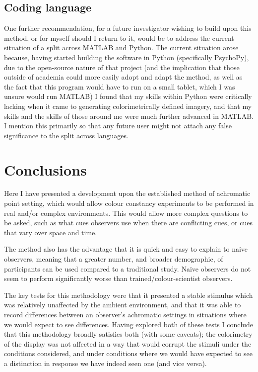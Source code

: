 \subsection{Coding language}

One further recommendation, for a future investigator wishing to build upon this method, or for myself should I return to it, would be to address the current situation of a split across \gls{MATLAB} and Python. The current situation arose because, having started building the software in Python (specifically PsychoPy), due to the open-source nature of that project (and the implication that those outside of academia could more easily adopt and adapt the method, as well as the fact that this program would have to run on a small tablet, which I was unsure would run \gls{MATLAB}) I found that my skills within Python were critically lacking when it came to generating colorimetrically defined imagery, and that my skills and the skills of those around me were much further advanced in \gls{MATLAB}. I mention this primarily so that any future user might not attach any false significance to the split across languages.

\section{Conclusions}

Here I have presented a development upon the established method of achromatic point setting, which would allow colour constancy experiments to be performed in real and/or complex environments. This would allow more complex questions to be asked, such as what cues observers use when there are conflicting cues, or cues that vary over space and time.

The method also has the advantage that it is quick and easy to explain to naive observers, meaning that a greater number, and broader demographic, of participants can be used compared to a traditional study. Naive observers do not seem to perform significantly worse than trained/colour-scientist observers.

The key tests for this methodology were that it presented a stable stimulus which was relatively unaffected by the ambient environment, and that it was able to record differences between an observer's achromatic settings in situations where we would expect to see differences. Having explored both of these tests I conclude that this methodology broadly satisfies both (with some caveats); the colorimetry of the display was not affected in a way that would corrupt the stimuli under the conditions considered, and under conditions where we would have expected to see a distinction in response we have indeed seen one (and vice versa).

